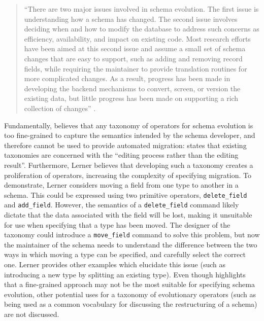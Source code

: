  \begin{quote}
 ``There are two major issues involved in schema evolution. The first issue is understanding how a schema has changed. The second issue involves deciding when and how to modify the database to address such concerns as efficiency, availability, and impact on existing code. Most research efforts have been aimed at this second issue and assume a small set of schema changes that are easy to support, such as adding and removing record fields, while requiring the maintainer to provide translation routines for more complicated changes. As a result, progress has been made in developing the backend mechanisms to convert, screen, or version the existing data, but little progress has been made on supporting a rich collection of changes'' \cite{lerner00model}.
 \end{quote}

Fundamentally, \cite{lerner00model} believes that any taxonomy of operators for schema evolution is too fine-grained to capture the semantics intended by the schema developer, and therefore cannot be used to provide automated migration: \cite{lerner00model} states that existing taxonomies are concerned with the ``editing process rather than the editing result''. Furthermore, Lerner believes that developing such a taxonomy creates a proliferation of operators, increasing the complexity of specifying migration. To demonstrate, Lerner  considers moving a field from one type to another in a schema. This could be expressed using two primitive operators, \verb|delete_field| and \verb|add_field|. However, the semantics of a \verb|delete_field| command likely dictate that the data associated with the field will be lost, making it unsuitable for use when specifying that a type has been moved. The designer of the taxonomy could introduce a \verb|move_field| command to solve this problem, but now the maintainer of the schema needs to understand the difference between the two ways in which moving a type can be specified, and carefully select the correct one. Lerner provides other examples which elucidate this issue (such as introducing a new type by splitting an existing type). Even though \cite{lerner00model} highlights that a fine-grained approach may not be the most suitable for specifying schema evolution,  other potential uses for a taxonomy of evolutionary operators (such as being used as a common vocabulary for discussing the restructuring of a schema) are not discussed.

